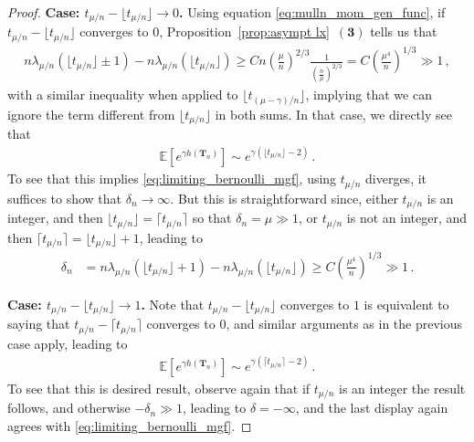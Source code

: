 \documentclass{article}
\newcommand{\E}{\mathbb{E}}								%
\newcommand{\1}{\mathbbm{1}}								%
\theoremstyle{definition}
\numberwithin{equation}{section}
\newcommand{\bT}{\mathbf T}
\newcommand{\numitem}[1]{$\mathbf{(#1)}$}
\begin{document}
\begin{proof}
    
    \noindent \textbf{Case: $t_{\mu/n}-\lfloor t_{\mu/n} \rfloor \to 0$.} Using equation \eqref{eq:mulln_mom_gen_func}, if $t_{\mu/n}-\lfloor t_{\mu/n}\rfloor$ converges to $0$, Proposition~\ref{prop:asympt lx}~\numitem{3} tells us that
    \begin{align*}
        n\lambda_{\mu/n}(\lfloor t_{\mu/n}\rfloor\pm1)-n\lambda_{\mu/n}(\lfloor t_{\mu/n}\rfloor)\geq Cn\left(\frac{\mu}{n}\right)^{2/3}\frac{1}{\left(\frac{n}{\mu}\right)^{2/3}}=C\left(\frac{\mu^4}{n}\right)^{1/3}\gg1\,,
    \end{align*}
    with a similar inequality when applied to $\lfloor t_{(\mu-\gamma)/n}\rfloor$, implying that we can ignore the term different from $\lfloor t_{\mu/n}\rfloor$ in both sums.
    In that case, we directly see that
    \begin{align*}
        \E\left[e^{\gamma h(\bT_n)}\right]\sim e^{\gamma\left(\lfloor t_{\mu/n}\rfloor-2\right)}\,.
    \end{align*}
    To see that this implies \eqref{eq:limiting_bernoulli_mgf}, using $t_{\mu/n}$ diverges, it suffices to show that $\delta_n\rightarrow\infty$.
    But this is straightforward since, either $t_{\mu/n}$ is an integer, and then $\lfloor t_{\mu/n}\rfloor=\lceil t_{\mu/n}\rceil$ so that $\delta_n=\mu\gg1$, or $t_{\mu/n}$ is not an integer, and then $\lceil t_{\mu/n}\rceil=\lfloor t_{\mu/n}\rfloor+1$, leading to
    \begin{align*}
        \delta_n&=n\lambda_{\mu/n}(\lfloor t_{\mu/n}\rfloor+1)-n\lambda_{\mu/n}(\lfloor t_{\mu/n}\rfloor)\geq C\left(\frac{\mu^4}{n}\right)^{1/3}\gg1\,.
    \end{align*}
    
    \noindent \textbf{Case: $t_{\mu/n}-\lfloor t_{\mu/n} \rfloor \to 1$.} Note that $t_{\mu/n}-\lfloor t_{\mu/n}\rfloor$ converges to $1$ is equivalent to saying that $t_{\mu/n}-\lceil t_{\mu/n}\rceil$ converges to $0$, and similar arguments as in the previous case apply, leading to
    \begin{align*}
        \E\left[e^{\gamma h(\bT_n)}\right]\sim e^{\gamma\left(\lceil t_{\mu/n}\rceil-2\right)}\,.
    \end{align*}
    To see that this is desired result, observe again that if $t_{\mu/n}$ is an integer the result follows, and otherwise $-\delta_n\gg1$, leading to $\delta=-\infty$, and the last display again agrees with \eqref{eq:limiting_bernoulli_mgf}.


\end{proof}
\end{document}
